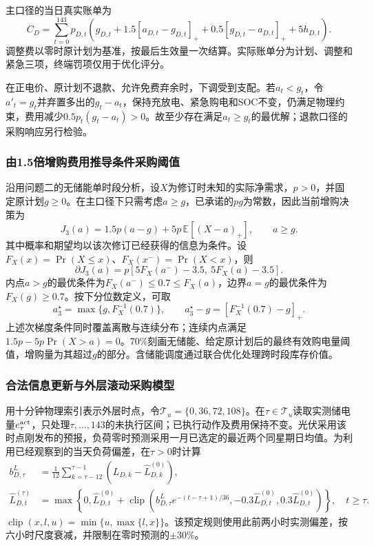 主口径的当日真实账单为
\begin{equation}
 C_D=\sum_{t=0}^{143}p_{D,t}\left(g_{D,t}+1.5[a_{D,t}-g_{D,t}]_+
 +0.5[g_{D,t}-a_{D,t}]_++5h_{D,t}\right).
 \label{eq:settlement}
\end{equation}
调整费以零时原计划为基准，按最后生效量一次结算。实际账单分为计划、调整和紧急三项，终端罚项仅用于优化评分。

在正电价、原计划不退款、允许免费弃余时，下调受到支配。若$a_t<g_t$，令$a'_t=g_t$并弃置多出的$g_t-a_t$，保持充放电、紧急购电和SOC不变，仍满足物理约束，费用减少$0.5p_t(g_t-a_t)>0$。故至少存在满足$a_t\ge g_t$的最优解；退款口径的采购响应另行检验。

\subsubsection{由1.5倍增购费用推导条件采购阈值}

沿用问题二的无储能单时段分析，设$X$为修订时未知的实际净需求，$p>0$，并固定原计划$g\ge0$。在主口径下只需考虑$a\ge g$，已承诺的$pg$为常数，因此当前增购决策为
\begin{equation}
 J_3(a)=1.5p(a-g)+5p\,\mathbb E[(X-a)_+],\qquad a\ge g.
 \label{eq:mech_q3_cost}
\end{equation}
其中概率和期望均以该次修订已经获得的信息为条件。设$F_X(x)=\Pr(X\le x)$、$F_X(x^-)=\Pr(X<x)$，则
\begin{equation}
 \partial J_3(a)=p[5F_X(a^-)-3.5,\ 5F_X(a)-3.5].
 \label{eq:q3_adjustment_subgradient}
\end{equation}
内点$a>g$的最优条件为$F_X(a^-)\le0.7\le F_X(a)$，边界$a=g$的最优条件为$F_X(g)\ge0.7$。按下分位数定义，可取
\begin{equation}
 a_3^\star=\max\{g,F_X^{-1}(0.7)\},\qquad
 a_3^\star-g=[F_X^{-1}(0.7)-g]_+.
 \label{eq:mech_q3_quantile}
\end{equation}
上述次梯度条件同时覆盖离散与连续分布；连续内点满足$1.5p-5p\Pr(X>a)=0$。70\%刻画无储能、给定原计划后的最终有效购电量阈值，增购量为其超过$g$的部分。含储能调度通过联合优化处理跨时段库存价值。

\subsubsection{合法信息更新与外层滚动采购模型}

用十分钟物理索引表示外层时点，令$\mathcal T_u=\{0,36,72,108\}$。在$\tau\in\mathcal T_u$读取实测储电量$e_\tau^{\rm act}$，只处理$\tau,\ldots,143$的未执行区间；已执行动作及费用保持不变。光伏采用该时点刚发布的预报，负荷零时预测采用一月已选定的最近两个同星期日均值。为利用已经观察到的当天负荷偏差，在$\tau>0$时计算
\begin{align}
 b^L_{D,\tau}&=\frac{1}{12}\sum_{k=\tau-12}^{\tau-1}
       (L_{D,k}-\widehat L^{(0)}_{D,k}),\label{eq:q3_load_bias}\\
 \widehat L^{(\tau)}_{D,t}&=\max\left\{0,\widehat L^{(0)}_{D,t}+
 \operatorname{clip}\!\left(b^L_{D,\tau}e^{-(t-\tau+1)/36},
       -0.3\widehat L^{(0)}_{D,t},0.3\widehat L^{(0)}_{D,t}\right)\right\},\quad t\ge\tau.
 \label{eq:q3_load_update}
\end{align}
$\operatorname{clip}(x,l,u)=\min\{u,\max\{l,x\}\}$。该预定规则使用此前两小时实测偏差，按六小时尺度衰减，并限制在零时预测的$\pm30\%$。

